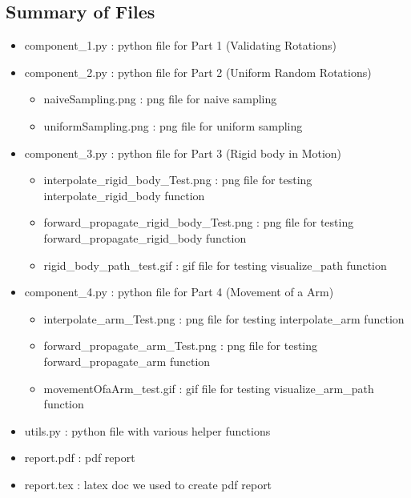 \documentclass[12pt]{article}
\begin{document}
\subsection*{Summary of Files}
\begin{itemize}
    \item component\_1.py : python file for Part 1 (Validating Rotations)
    \item component\_2.py : python file for Part 2 (Uniform Random Rotations)
    \begin{itemize}
        \item naiveSampling.png : png file for naive sampling
        \item uniformSampling.png : png file for uniform sampling
    \end{itemize}
    \item component\_3.py : python file for Part 3 (Rigid body in Motion)
    \begin{itemize}
        \item interpolate\_rigid\_body\_Test.png : png file for testing interpolate\_rigid\_body function
        \item forward\_propagate\_rigid\_body\_Test.png : png file for testing forward\_propagate\_rigid\_body function
        \item rigid\_body\_path\_test.gif : gif file for testing visualize\_path function
    \end{itemize}
    \item component\_4.py : python file for Part 4 (Movement of a Arm)
    \begin{itemize}
        \item interpolate\_arm\_Test.png : png file for testing interpolate\_arm function
        \item forward\_propagate\_arm\_Test.png : png file for testing forward\_propagate\_arm function
        \item movementOfaArm\_test.gif : gif file for testing visualize\_arm\_path function
    \end{itemize}
    \item utils.py : python file with various helper functions
    \item report.pdf : pdf report
    \item report.tex : latex doc we used to create pdf report
\end{itemize}
\end{document}
